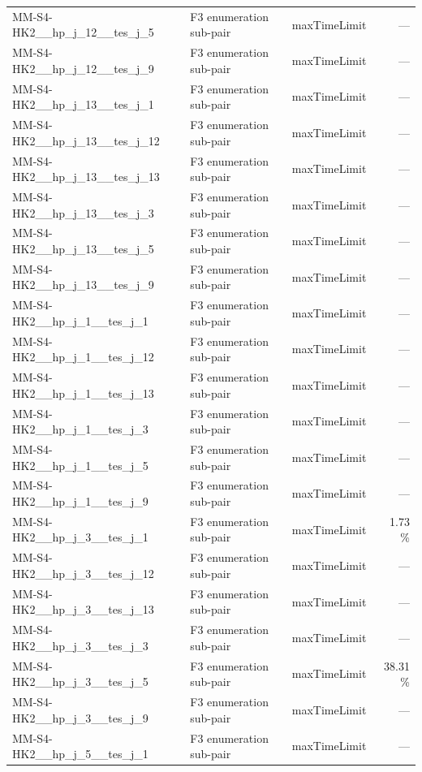 \begin{table}[htbp]
\begin{tabular}{lllr}
  MM-S4-HK2\_\_hp\_j\_12\_\_tes\_j\_5 & F3 enumeration sub-pair & maxTimeLimit & — \\
  MM-S4-HK2\_\_hp\_j\_12\_\_tes\_j\_9 & F3 enumeration sub-pair & maxTimeLimit & — \\
  MM-S4-HK2\_\_hp\_j\_13\_\_tes\_j\_1 & F3 enumeration sub-pair & maxTimeLimit & — \\
  MM-S4-HK2\_\_hp\_j\_13\_\_tes\_j\_12 & F3 enumeration sub-pair & maxTimeLimit & — \\
  MM-S4-HK2\_\_hp\_j\_13\_\_tes\_j\_13 & F3 enumeration sub-pair & maxTimeLimit & — \\
  MM-S4-HK2\_\_hp\_j\_13\_\_tes\_j\_3 & F3 enumeration sub-pair & maxTimeLimit & — \\
  MM-S4-HK2\_\_hp\_j\_13\_\_tes\_j\_5 & F3 enumeration sub-pair & maxTimeLimit & — \\
  MM-S4-HK2\_\_hp\_j\_13\_\_tes\_j\_9 & F3 enumeration sub-pair & maxTimeLimit & — \\
  MM-S4-HK2\_\_hp\_j\_1\_\_tes\_j\_1 & F3 enumeration sub-pair & maxTimeLimit & — \\
  MM-S4-HK2\_\_hp\_j\_1\_\_tes\_j\_12 & F3 enumeration sub-pair & maxTimeLimit & — \\
  MM-S4-HK2\_\_hp\_j\_1\_\_tes\_j\_13 & F3 enumeration sub-pair & maxTimeLimit & — \\
  MM-S4-HK2\_\_hp\_j\_1\_\_tes\_j\_3 & F3 enumeration sub-pair & maxTimeLimit & — \\
  MM-S4-HK2\_\_hp\_j\_1\_\_tes\_j\_5 & F3 enumeration sub-pair & maxTimeLimit & — \\
  MM-S4-HK2\_\_hp\_j\_1\_\_tes\_j\_9 & F3 enumeration sub-pair & maxTimeLimit & — \\
  MM-S4-HK2\_\_hp\_j\_3\_\_tes\_j\_1 & F3 enumeration sub-pair & maxTimeLimit & 1.73 \% \\
  MM-S4-HK2\_\_hp\_j\_3\_\_tes\_j\_12 & F3 enumeration sub-pair & maxTimeLimit & — \\
  MM-S4-HK2\_\_hp\_j\_3\_\_tes\_j\_13 & F3 enumeration sub-pair & maxTimeLimit & — \\
  MM-S4-HK2\_\_hp\_j\_3\_\_tes\_j\_3 & F3 enumeration sub-pair & maxTimeLimit & — \\
  MM-S4-HK2\_\_hp\_j\_3\_\_tes\_j\_5 & F3 enumeration sub-pair & maxTimeLimit & 38.31 \% \\
  MM-S4-HK2\_\_hp\_j\_3\_\_tes\_j\_9 & F3 enumeration sub-pair & maxTimeLimit & — \\
  MM-S4-HK2\_\_hp\_j\_5\_\_tes\_j\_1 & F3 enumeration sub-pair & maxTimeLimit & — \\

\end{tabular}
\end{table}
